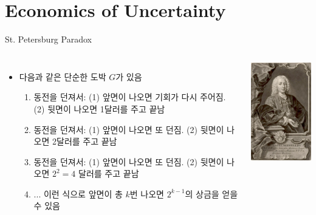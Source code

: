 \documentclass[final]{beamer}
\begin{document}

\section{Economics of Uncertainty} %
\label{sec:economics_of_uncertainty}

\begin{frame}[t]{St. Petersburg Paradox}
	\begin{columns}
		\begin{itemize}
			\item 다음과 같은 단순한 도박 $G$가 있음
			\begin{enumerate}
				\item 동전을 던져서: (1) 앞면이 나오면 기회가 다시 주어짐. (2) 뒷면이 나오면 1달러를 주고 끝남
				\item 동전을 던져서: (1) 앞면이 나오면 또 던짐. (2) 뒷면이 나오면 2달러를 주고 끝남
				\item 동전을 던져서: (1) 앞면이 나오면 또 던짐. (2) 뒷면이 나오면 $2^2=4$ 달러를 주고 끝남
				\item ... 이런 식으로 앞면이 총 $k$번 나오면 $2^{k-1}$의 상금을 얻을 수 있음
			\end{enumerate}
		\end{itemize}
		{\includegraphics[width=11em]{daniel_Bernoulli.jpg}}
	\end{columns}
\end{frame}
\end{document}
